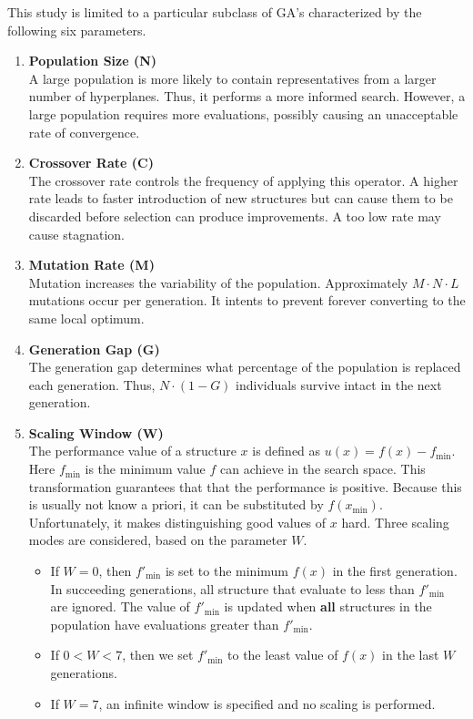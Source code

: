 \documentclass[../main.tex]{subfiles}
\begin{document}
This study is limited to a particular subclass of GA's characterized by the following six parameters.

\begin{enumerate}
	\item \textbf{Population Size (N)} \\
	A large population is more likely to contain representatives from a larger number of hyperplanes. Thus, it performs
	a more informed search. However, a large population requires more evaluations, possibly causing an unacceptable
	rate of convergence.

	\item \textbf{Crossover Rate (C)} \\
	The crossover rate controls the frequency of applying this operator. A higher rate leads to faster introduction of
	new structures but can cause them to be discarded before selection can produce improvements. A too low rate may
	cause stagnation.

	\item \textbf{Mutation Rate (M)} \\
	Mutation increases the variability of the population. Approximately $M \cdot N \cdot L$ mutations occur per
	generation. It intents to prevent forever converting to the same local optimum.

	\item \textbf{Generation Gap (G)} \\
	The generation gap determines what percentage of the population is replaced each generation. Thus, $N \cdot (1-G)$
	individuals survive intact in the next generation.

	\item \textbf{Scaling Window (W)} \\
	The performance value of a structure $x$ is defined as $u(x) = f(x) - f_{\text{min}}$. Here $f_{\text{min}}$ is the
	minimum value $f$ can achieve in the search space. This transformation guarantees that that the performance is
	positive. Because this is usually not know a priori, it can be substituted by $f(x_{\text{min}})$. Unfortunately,
	it makes distinguishing good values of $x$ hard. Three scaling modes are considered, based on the parameter $W$.

	\begin{itemize}
		\item If $W = 0$, then $f'_{\text{min}}$ is set to the minimum $f(x)$ in the first generation. In succeeding
		generations, all structure that evaluate to less than $f'_{\text{min}}$  are ignored. The value of
		$f'_{\text{min}}$ is updated when \textbf{all} structures in the population have evaluations greater than
		$f'_{\text{min}}$.
		\item If $0 < W < 7$, then we set $f'_{\text{min}}$ to the least value of $f(x)$ in the last $W$ generations.
		\item If $W = 7$, an infinite window is specified and no scaling is performed.
	\end{itemize}


\end{enumerate}
\end{document}
